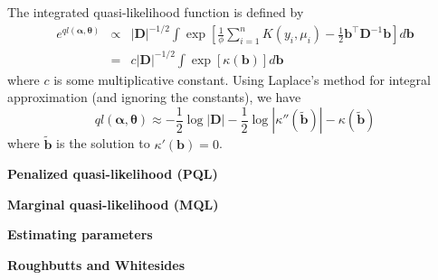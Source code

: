 \documentclass[mathserif, 11pt, t]{beamer}
\newcommand{\m}[1]{\mathbf{\bm{#1}}}
\renewcommand{\subtitle}[1]{\vspace{0.45cm}\textcolor{bluegreen}{
    {\textbf{#1}}}\vspace{0.15cm}\newline}
\begin{document}
\begin{frame}

\bigskip
\bigskip

The integrated quasi-likelihood function is defined by
\begin{eqnarray*}
e^{ql(\m{\alpha}, \m{\theta})} &\propto& |\m{D}|^{-1/2}\int\exp\left[\frac{1}{\phi}\sum_{i=1}^nK(y_i,\mu_i)-\frac{1}{2}\m{b}^\top\m{D}^{-1}\m{b} \right]d\m{b} \\
&=& c|\m{D}|^{-1/2}\int\exp\left[ \kappa(\m{b}) \right] d\m{b} 
\end{eqnarray*}
where $c$ is some multiplicative constant. Using Laplace's method for integral approximation (and ignoring the constants), we have
\[ql(\m{\alpha}, \m{\theta}) \approx -\frac{1}{2}\log|\m{D}| -\frac{1}{2}\log|\kappa''(\tilde{\m{b}})| - \kappa(\tilde{\m{b}}) \]
where $\tilde{\m{b}}$ is the solution to $\kappa'(\m{b})=0$.

\end{frame}

\begin{frame}
\subtitle{Penalized quasi-likelihood (PQL)}

\subtitle{Marginal quasi-likelihood (MQL)}

\end{frame}



\begin{frame}
\subtitle{Estimating parameters}

\end{frame}



\begin{frame}
\subtitle{Roughbutts and Whitesides}

\end{frame}

\end{document}
